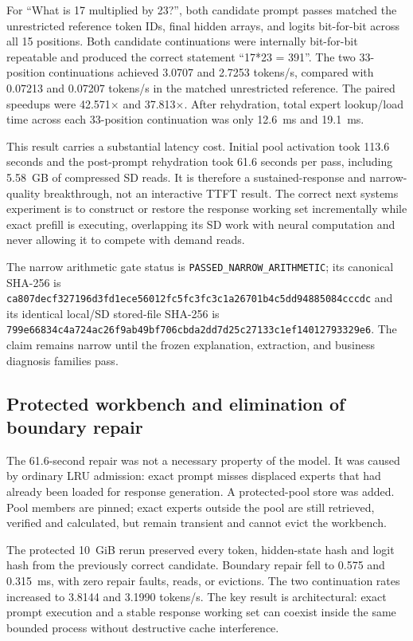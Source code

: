 For ``What is 17 multiplied by 23?'', both candidate prompt passes matched the
unrestricted reference token IDs, final hidden arrays, and logits bit-for-bit
across all 15 positions.  Both candidate continuations were internally
bit-for-bit repeatable and produced the correct statement
``17*23 = 391''.  The two 33-position continuations achieved 3.0707 and 2.7253
tokens/s, compared with 0.07213 and 0.07207 tokens/s in the matched unrestricted
reference.  The paired speedups were 42.571$\times$ and 37.813$\times$.
After rehydration, total expert lookup/load time across each 33-position
continuation was only 12.6~ms and 19.1~ms.

This result carries a substantial latency cost.  Initial pool activation took
113.6 seconds and the post-prompt rehydration took 61.6 seconds per pass,
including 5.58~GB of compressed SD reads.  It is therefore a sustained-response
and narrow-quality breakthrough, not an interactive TTFT result.  The correct
next systems experiment is to construct or restore the response working set
incrementally while exact prefill is executing, overlapping its SD work with
neural computation and never allowing it to compete with demand reads.

The narrow arithmetic gate status is
\texttt{PASSED\_NARROW\_ARITHMETIC}; its canonical SHA-256 is
\texttt{ca807decf327196d3fd1ece56012fc5fc3fc3c1a26701b4c5dd94885084cccdc}
and its identical local/SD stored-file SHA-256 is
\texttt{799e66834c4a724ac26f9ab49bf706cbda2dd7d25c27133c1ef14012793329e6}.
The claim remains narrow until the frozen explanation, extraction, and business
diagnosis families pass.

\subsection{Protected workbench and elimination of boundary repair}

The 61.6-second repair was not a necessary property of the model.  It was caused
by ordinary LRU admission: exact prompt misses displaced experts that had
already been loaded for response generation.  A protected-pool store was added.
Pool members are pinned; exact experts outside the pool are still retrieved,
verified and calculated, but remain transient and cannot evict the workbench.

The protected 10~GiB rerun preserved every token, hidden-state hash and logit
hash from the previously correct candidate.  Boundary repair fell to 0.575 and
0.315~ms, with zero repair faults, reads, or evictions.  The two continuation
rates increased to 3.8144 and 3.1990 tokens/s.  The key result is architectural:
exact prompt execution and a stable response working set can coexist inside the
same bounded process without destructive cache interference.

